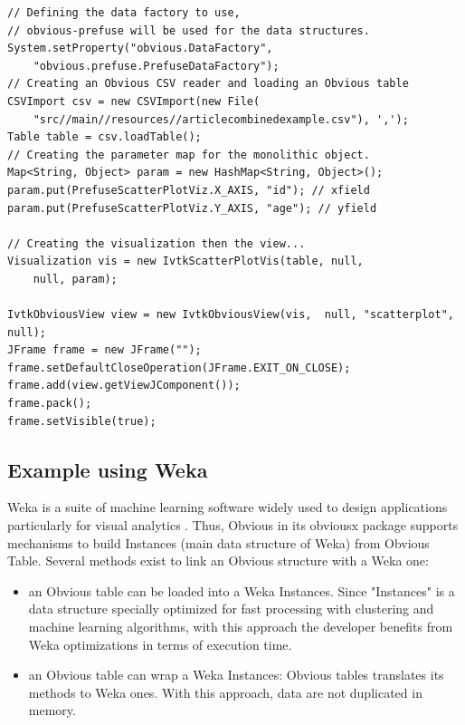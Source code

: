 \begin{lstlisting}
// Defining the data factory to use,
// obvious-prefuse will be used for the data structures.
System.setProperty("obvious.DataFactory",
    "obvious.prefuse.PrefuseDataFactory");
// Creating an Obvious CSV reader and loading an Obvious table
CSVImport csv = new CSVImport(new File(
    "src//main//resources//articlecombinedexample.csv"), ',');
Table table = csv.loadTable();
// Creating the parameter map for the monolithic object.
Map<String, Object> param = new HashMap<String, Object>();
param.put(PrefuseScatterPlotViz.X_AXIS, "id"); // xfield
param.put(PrefuseScatterPlotViz.Y_AXIS, "age"); // yfield

// Creating the visualization then the view...
Visualization vis = new IvtkScatterPlotVis(table, null,
    null, param);

IvtkObviousView view = new IvtkObviousView(vis,  null, "scatterplot", null);
JFrame frame = new JFrame("");
frame.setDefaultCloseOperation(JFrame.EXIT_ON_CLOSE);
frame.add(view.getViewJComponent());
frame.pack();
frame.setVisible(true);
\end{lstlisting}
\subsection{Example using Weka}

Weka \cite{Weka} is a suite of machine learning software widely used to design applications particularly for visual analytics . Thus, Obvious in its obviousx package supports mechanisms to build Instances (main data structure of Weka) from Obvious Table. Several methods exist to link an Obvious structure with a Weka one:

\begin{itemize}
\item an Obvious table can be loaded into a Weka Instances. Since "Instances" is a data structure specially optimized for fast processing with clustering and machine learning algorithms, with this approach the developer benefits from Weka optimizations in terms of execution time.
\item an Obvious table can wrap a Weka Instances: Obvious tables translates its methods to Weka ones. With this approach, data are not duplicated in memory.
\end{itemize}

